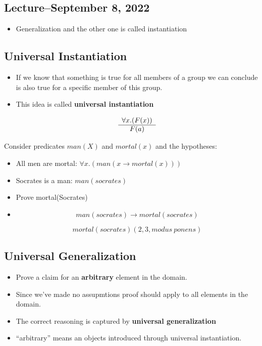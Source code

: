 \documentclass[8pt]{scrreprt}
\begin{document}
\begin{landscape}
\begin{multicols*}{3}
\section{Lecture--September 8, 2022}

\begin{itemize}
	\item Generalization and the other one is called instantiation
\end{itemize}

\subsection{Universal Instantiation}

\begin{itemize}
	\item If we know that something is true for all members of a group we can
	      conclude is also true for a specific member of this group.
	\item This idea is called \textbf{universal instantiation}

	      \[
		      \begin{array}[]{c}
			      \forall x.(F(x)) \\
			      \hline
			      F(a)
		      \end{array}
	      \]
\end{itemize}

\begin{example}
	Consider predicates $man(X)$ and $mortal(x)$ and the hypotheses:

	\begin{itemize}
		\item All men are mortal: $\forall x. (man(x\rightarrow mortal(x)))$
		\item Socrates is a man: $man(socrates)$
		\item Prove mortal(Socrates)
		\item \[
			      man(socrates)\rightarrow mortal(socrates)
		      \]

		      \[
			      mortal(socrates) (2, 3, modus\: ponens)
		      \]
	\end{itemize}
\end{example}

\subsection{Universal Generalization}
\begin{itemize}
	\item Prove a claim for an \textbf{arbitrary} element in the domain.
	\item Since we've made no assupmtions proof should apply to all elements in the domain.
	\item The correct reasoning is captured by \textbf{universal generalization}
	\item ``arbitrary'' means an objects introduced through universal instantiation.


\end{itemize}
\end{multicols*}
\end{landscape}
\end{document}
